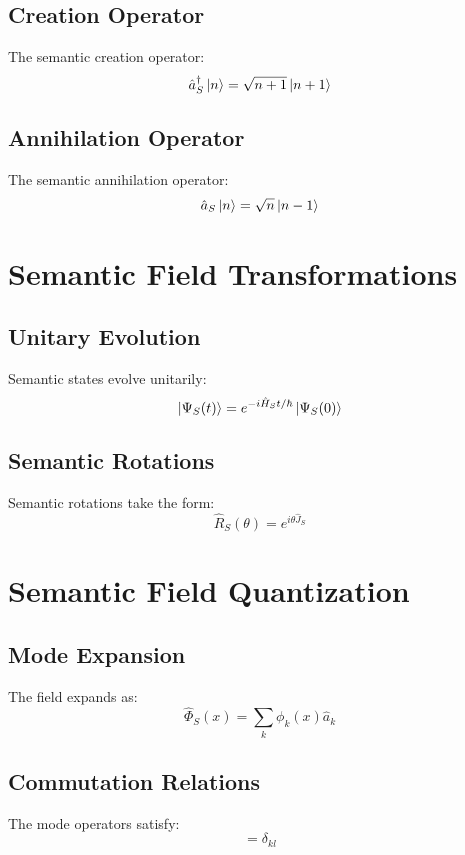 \documentclass[12pt]{article}
\begin{document}
\subsection{Creation Operator}
The semantic creation operator:
\begin{equation}
\hat{a}_S^\dagger\ket{n} = \sqrt{n+1}\ket{n+1}
\end{equation}
\subsection{Annihilation Operator}
The semantic annihilation operator:
\begin{equation}
\hat{a}_S\ket{n} = \sqrt{n}\ket{n-1}
\end{equation}
\section{Semantic Field Transformations}
\subsection{Unitary Evolution}
Semantic states evolve unitarily:
\begin{equation}
\ket{\Psi_S(t)} = e^{-i\hat{H}_St/\hbar}\ket{\Psi_S(0)}
\end{equation}
\subsection{Semantic Rotations}
Semantic rotations take the form:
\begin{equation}
\hat{R}_S(\theta) = e^{i\theta\hat{J}_S}
\end{equation}
\section{Semantic Field Quantization}
\subsection{Mode Expansion}
The field expands as:
\begin{equation}
\hat{\Phi}_S(x) = \sum_k \phi_k(x)\hat{a}_k
\end{equation}
\subsection{Commutation Relations}
The mode operators satisfy:
\begin{equation}
[\hat{a}_k,\hat{a}_l^\dagger] = \delta_{kl}
\end{equation}
\end{document}
